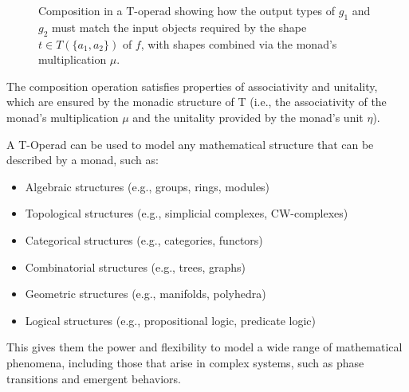 \begin{figure}[h]
\centering
{}
\caption{Composition in a T-operad showing how the output types of $g_1$ and $g_2$ must match the input objects required by the shape $t \in T(\{a_1, a_2\})$ of $f$, with shapes combined via the monad's multiplication $\mu$.}
\label{fig:t-operadic-composition}
\end{figure}

The composition operation satisfies properties of associativity and unitality, which are ensured by the monadic structure of T (i.e., the associativity of the monad's multiplication $\mu$ and the unitality provided by the monad's unit $\eta$).

A T-Operad can be used to model any mathematical structure that can be described by a monad, such as:
\begin{itemize}
    \item Algebraic structures (e.g., groups, rings, modules)
    \item Topological structures (e.g., simplicial complexes, CW-complexes)
    \item Categorical structures (e.g., categories, functors)
    \item Combinatorial structures (e.g., trees, graphs)
    \item Geometric structures (e.g., manifolds, polyhedra)
    \item Logical structures (e.g., propositional logic, predicate logic)
\end{itemize}

This gives them the power and flexibility to model a wide range of mathematical phenomena, including those that arise in complex systems, such as phase transitions and emergent behaviors.


